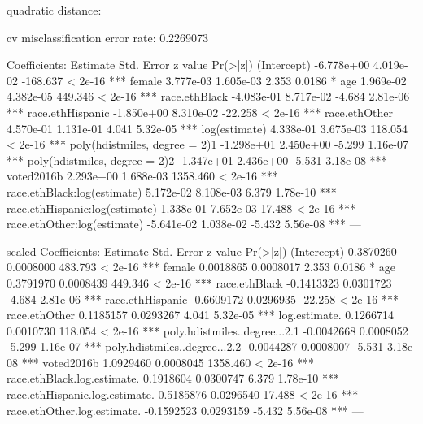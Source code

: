 quadratic distance: 

cv misclassification error rate: 0.2269073

Coefficients:
                                 Estimate Std. Error  z value Pr(>|z|)    
(Intercept)                    -6.778e+00  4.019e-02 -168.637  < 2e-16 ***
female                          3.777e-03  1.605e-03    2.353   0.0186 *  
age                             1.969e-02  4.382e-05  449.346  < 2e-16 ***
race.ethBlack                  -4.083e-01  8.717e-02   -4.684 2.81e-06 ***
race.ethHispanic               -1.850e+00  8.310e-02  -22.258  < 2e-16 ***
race.ethOther                   4.570e-01  1.131e-01    4.041 5.32e-05 ***
log(estimate)                   4.338e-01  3.675e-03  118.054  < 2e-16 ***
poly(hdistmiles, degree = 2)1  -1.298e+01  2.450e+00   -5.299 1.16e-07 ***
poly(hdistmiles, degree = 2)2  -1.347e+01  2.436e+00   -5.531 3.18e-08 ***
voted2016b                      2.293e+00  1.688e-03 1358.460  < 2e-16 ***
race.ethBlack:log(estimate)     5.172e-02  8.108e-03    6.379 1.78e-10 ***
race.ethHispanic:log(estimate)  1.338e-01  7.652e-03   17.488  < 2e-16 ***
race.ethOther:log(estimate)    -5.641e-02  1.038e-02   -5.432 5.56e-08 ***
---


scaled Coefficients:
                                 Estimate Std. Error  z value Pr(>|z|)    
(Intercept)                     0.3870260  0.0008000  483.793  < 2e-16 ***
female                          0.0018865  0.0008017    2.353   0.0186 *  
age                             0.3791970  0.0008439  449.346  < 2e-16 ***
race.ethBlack                  -0.1413323  0.0301723   -4.684 2.81e-06 ***
race.ethHispanic               -0.6609172  0.0296935  -22.258  < 2e-16 ***
race.ethOther                   0.1185157  0.0293267    4.041 5.32e-05 ***
log.estimate.                   0.1266714  0.0010730  118.054  < 2e-16 ***
poly.hdistmiles..degree...2.1  -0.0042668  0.0008052   -5.299 1.16e-07 ***
poly.hdistmiles..degree...2.2  -0.0044287  0.0008007   -5.531 3.18e-08 ***
voted2016b                      1.0929460  0.0008045 1358.460  < 2e-16 ***
race.ethBlack.log.estimate.     0.1918604  0.0300747    6.379 1.78e-10 ***
race.ethHispanic.log.estimate.  0.5185876  0.0296540   17.488  < 2e-16 ***
race.ethOther.log.estimate.    -0.1592523  0.0293159   -5.432 5.56e-08 ***
---




